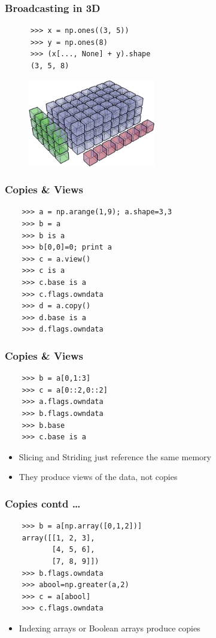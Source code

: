 \documentclass[14pt,compress]{beamer}
\newcounter{time}
\newcommand{\inctime}[1]{\addtocounter{time}{#1}{\tiny \thetime\ m}}
\begin{document}
\begin{frame}[fragile]
  \frametitle{Broadcasting in 3D}
    \begin{lstlisting}
      >>> x = np.ones((3, 5))
      >>> y = np.ones(8)
      >>> (x[..., None] + y).shape
      (3, 5, 8)
    \end{lstlisting}
    \begin{figure}
      \begin{center}
      \includegraphics[height=1.5in, interpolate=true]{data/array_3x5x8}        
      \end{center}
    \end{figure}
\end{frame}

\begin{frame}[fragile]
  \frametitle{Copies \& Views}
  \vspace{-0.1in}
  \begin{lstlisting}
    >>> a = np.arange(1,9); a.shape=3,3
    >>> b = a
    >>> b is a
    >>> b[0,0]=0; print a
    >>> c = a.view()
    >>> c is a
    >>> c.base is a
    >>> c.flags.owndata
    >>> d = a.copy()
    >>> d.base is a
    >>> d.flags.owndata
  \end{lstlisting}
\end{frame}

\begin{frame}[fragile]
  \frametitle{Copies \& Views}
  \vspace{-0.1in}
  \begin{lstlisting}
    >>> b = a[0,1:3]
    >>> c = a[0::2,0::2]
    >>> a.flags.owndata
    >>> b.flags.owndata
    >>> b.base
    >>> c.base is a
  \end{lstlisting}
  \begin{itemize}
  \item Slicing and Striding just reference the same memory
  \item They produce views of the data, not copies
  \end{itemize}
\end{frame}

\begin{frame}[fragile]
  \frametitle{Copies contd \ldots}
  \begin{lstlisting}
    >>> b = a[np.array([0,1,2])]
    array([[1, 2, 3],
           [4, 5, 6],
           [7, 8, 9]])
    >>> b.flags.owndata
    >>> abool=np.greater(a,2)
    >>> c = a[abool]
    >>> c.flags.owndata
  \end{lstlisting}
  \begin{itemize}
  \item Indexing arrays or Boolean arrays produce copies
  \end{itemize}
\inctime{15}
\end{frame}
\end{document}
